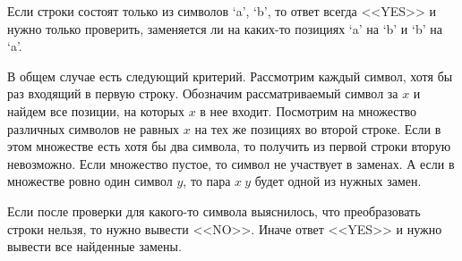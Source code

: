 Если строки состоят только из символов `a', `b', то ответ всегда <<YES>> и нужно только проверить, заменяется ли на каких-то позициях `a' на `b' и `b' на `a'. 

В общем случае есть следующий критерий. Рассмотрим каждый символ, хотя бы раз входящий в первую строку. Обозначим рассматриваемый символ за $x$ и найдем все позиции, на которых $x$ в нее входит. Посмотрим на множество различных символов не равных $x$ на тех же позициях во второй строке. Если в этом множестве есть хотя бы два символа, то получить из первой строки вторую невозможно. Если множество пустое, то символ не участвует в заменах. А если в множестве ровно один символ $y$, то пара $x\ y$ будет одной из нужных замен. 

Если после проверки для какого-то символа выяснилось, что преобразовать строки нельзя, то нужно вывести <<NO>>. Иначе ответ <<YES>> и нужно вывести все найденные замены.
